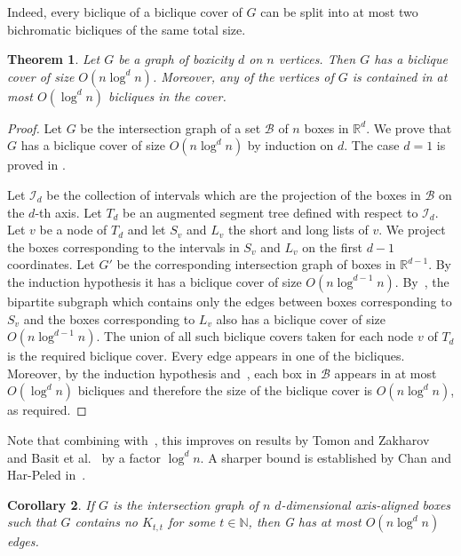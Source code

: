 \documentclass{amsart}
\newtheorem{theorem}{Theorem}%
\newtheorem{corollary}[theorem]{Corollary}
\begin{document}
Indeed, every biclique of a biclique cover of $G$ can be split into at most two bichromatic bicliques of the same total size.

\begin{theorem}\label{thm:boxes}
    Let $G$ be a graph of boxicity $d$ on $n$ vertices. 
    Then $G$ has a biclique cover of size $O(n \log^d n)$. Moreover, any of the vertices of $G$ is contained in at most $O(\log^d n)$ bicliques in the cover.
\end{theorem}

\begin{proof}
    Let $G$ be the intersection graph of a set $\mathcal{B}$ of $n$ boxes in $\mathbb{R}^d$. 
    We prove that $G$ has a biclique cover of size $O(n \log^d n)$ by induction on $d$. The case $d=1$ is proved in . 
    
    Let $\mathcal{I}_d$ be the collection of intervals which are the projection of the boxes in $\mathcal{B}$ on the $d$-th axis. Let $T_d$ be an augmented segment tree defined with respect to $\mathcal{I}_d$. Let $v$ be a node of $T_d$ and let $S_v$ and $L_v$ the short and long lists of $v$. We project the boxes corresponding to the intervals in $S_v$ and $L_v$ on the first $d-1$ coordinates. Let $G'$ be the corresponding intersection graph of boxes in $\mathbb{R}^{d-1}$. By the induction hypothesis it has a biclique cover of size $O(n \log^{d-1} n)$. By~, the bipartite subgraph which contains only the edges between boxes corresponding to $S_v$ and the boxes corresponding to $L_v$ also has a biclique cover of size $O(n \log^{d-1} n)$. The union of all such biclique covers taken for each node $v$ of $T_d$ is the required biclique cover. Every edge appears in one of the bicliques. Moreover, by the induction hypothesis and~, each box in $\mathcal{B}$ appears in at most $O(\log^d n)$ bicliques and therefore the size of the biclique cover is $O(n\log^d n)$, as required.
\end{proof}

Note that combining with~, this improves on results by Tomon and Zakharov~\cite{MR4328360} and Basit et al.~\cite{BCSTT21} by a factor $\log^d n$. A sharper bound is established by Chan and Har-Peled in~\cite{CHP25}. 

\begin{corollary}
    If $G$ is the intersection graph of $n$ $d$-dimensional axis-aligned boxes such that $G$ contains no $K_{t,t}$ for some $t\in\mathbb{N}$, then G has at most $O(n\log^d n)$ edges.
\end{corollary}
\end{document}
